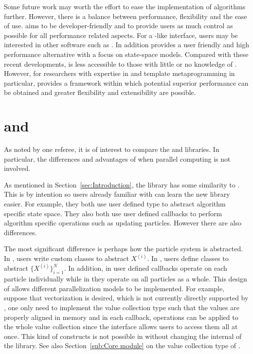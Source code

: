 \documentclass[11pt, fontset=Minion, showoverfull,
bib, biblatexstyle=numeric, mintcode, minted=cache]{marticle}
\begin{document}
Some future work may worth the effort to ease the implementation of \smc
algorithms further. However, there is a balance between performance,
flexibility and the ease of use. \vsmc aims to be developer-friendly and to
provide users as much control as possible for all performance related aspects.
For a \bugs-like interface, users may be interested in other software such as
\cbiips. In addition \clibbi provides a user friendly and high performance
alternative with a focus on state-space models. Compared with these recent
developments, \vsmc is less accessible to those with little or no knowledge of
\cpp. However, for researchers with expertise in \cpp and template
metaprogramming in particular, \vsmc provides a framework within which
potential superior performance can be obtained and greater flexibility and
extensibility are possible.

\clearpage
\appendix

\section[vsmc and smctc]{\protect\vsmc and \protect\smctc}
\label{sec:vsmc and smctc}

As noted by one referee, it is of interest to compare the \vsmc and \smctc
libraries. In particular, the differences and advantages of \vsmc when
parallel computing is not involved.

As mentioned in Section~\ref{sec:Introduction}, the \vsmc library has some
similarity to \smctc. This is by intention so users already familiar with
\smctc can learn the new library easier. For example, they both use user
defined type to abstract algorithm specific state space. They also both use
user defined callbacks to perform algorithm specific operations such as
updating particles. However there are also differences.

The most significant difference is perhaps how the particle system is
abstracted. In \smctc, users write custom classes to abstract $X^{(i)}$. In
\vsmc, users define classes to abstract $\{X^{(i)}\}_{i=1}^N$. In addition, in
\smctc user defined callbacks operate on each particle individually while in
\vsmc they operate on all particles as a whole. This design of \vsmc allows
different parallelization models to be implemented. For example, suppose that
\simd vectorization is desired, which is not currently directly supported by
\vsmc, one only need to implement the value collection type such that the
values are properly aligned in memory and in each callback, \simd operations
can be applied to the whole value collection since the \vsmc interface allows
users to access them all at once. This kind of constructs is not possible in
\smctc without changing the internal of the library. See also
Section~\ref{sub:Core module} on the value collection type of \vsmc.
\end{document}
